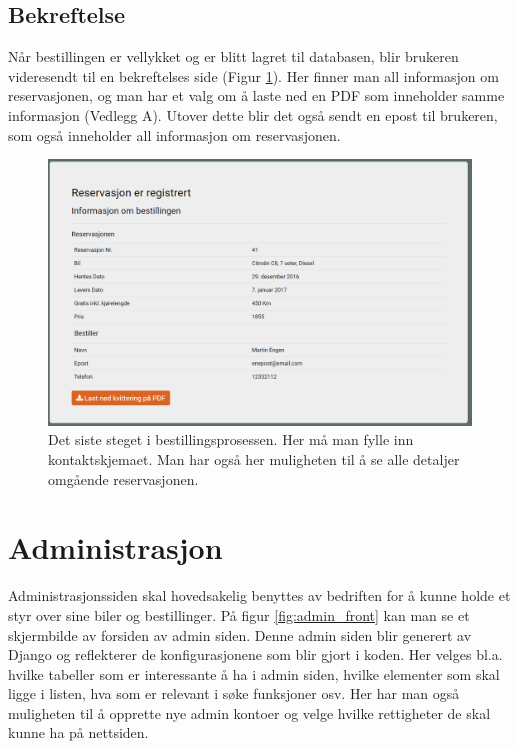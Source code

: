 \subsection{Bekreftelse}
Når bestillingen er vellykket og er blitt lagret til databasen, blir brukeren videresendt til en bekreftelses side (Figur \ref{fig:rv_customercontact}). Her finner man all informasjon om reservasjonen, og man har et valg om å laste ned en PDF som inneholder samme informasjon (Vedlegg A). Utover dette blir det også sendt en epost til brukeren, som også inneholder all informasjon om reservasjonen.



 \begin{figure}[htbp]
	\centering
		\includegraphics[scale=0.5]{Bilder/rv_receipt.png}
	\caption[Ordre Bekreftelse]{Det siste steget i bestillingsprosessen. Her må man fylle inn kontaktskjemaet. Man har også her muligheten til å se alle detaljer omgående reservasjonen.} %
	\label{fig:rv_customercontact}
\end{figure}



\clearpage
\section{Administrasjon}
Administrasjonssiden skal hovedsakelig benyttes av bedriften for å kunne holde et styr over sine biler og bestillinger. På figur \ref{fig:admin_front} kan man se et skjermbilde av forsiden av admin siden. Denne admin siden blir generert av Django og reflekterer de konfigurasjonene som blir gjort i koden. Her velges bl.a. hvilke tabeller som er interessante å ha i admin siden, hvilke elementer som skal ligge i listen, hva som er relevant i søke funksjoner osv. Her har man også muligheten til å opprette nye admin kontoer og velge hvilke rettigheter de skal kunne ha på nettsiden.

